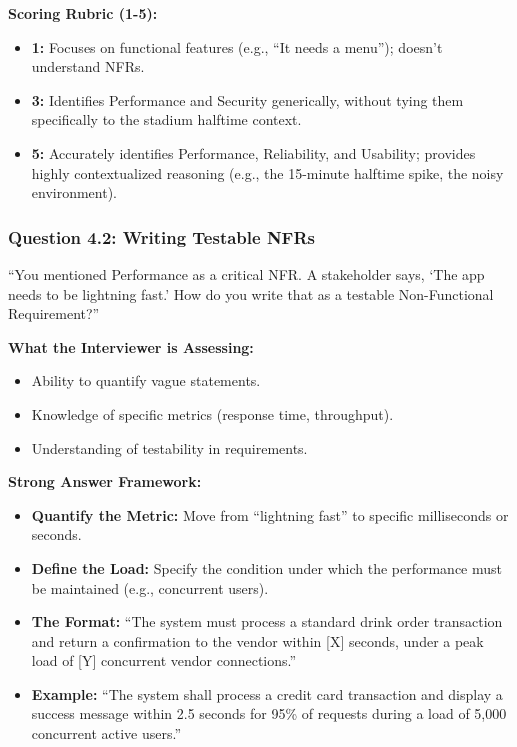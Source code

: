 \documentclass[
  11pt,
  openany,
  oneside]{book}
\providecommand{\tightlist}{%
  \setlength{\itemsep}{0pt}\setlength{\parskip}{0pt}}
\begin{document}
\textbf{Scoring Rubric (1-5):}

\begin{itemize}
\tightlist
\item
  \textbf{1:} Focuses on functional features (e.g., ``It needs a
  menu''); doesn't understand NFRs.
\item
  \textbf{3:} Identifies Performance and Security generically, without
  tying them specifically to the stadium halftime context.
\item
  \textbf{5:} Accurately identifies Performance, Reliability, and
  Usability; provides highly contextualized reasoning (e.g., the
  15-minute halftime spike, the noisy environment).
\end{itemize}

\subsubsection{Question 4.2: Writing Testable
NFRs}\label{question-4.2-writing-testable-nfrs}

``You mentioned Performance as a critical NFR. A stakeholder says, `The
app needs to be lightning fast.' How do you write that as a testable
Non-Functional Requirement?''

\textbf{What the Interviewer is Assessing:}

\begin{itemize}
\tightlist
\item
  Ability to quantify vague statements.
\item
  Knowledge of specific metrics (response time, throughput).
\item
  Understanding of testability in requirements.
\end{itemize}

\textbf{Strong Answer Framework:}

\begin{itemize}
\tightlist
\item
  \textbf{Quantify the Metric:} Move from ``lightning fast'' to specific
  milliseconds or seconds.
\item
  \textbf{Define the Load:} Specify the condition under which the
  performance must be maintained (e.g., concurrent users).
\item
  \textbf{The Format:} ``The system must process a standard drink order
  transaction and return a confirmation to the vendor within {[}X{]}
  seconds, under a peak load of {[}Y{]} concurrent vendor connections.''
\item
  \textbf{Example:} ``The system shall process a credit card transaction
  and display a success message within 2.5 seconds for 95\% of requests
  during a load of 5,000 concurrent active users.''
\end{itemize}
\end{document}
